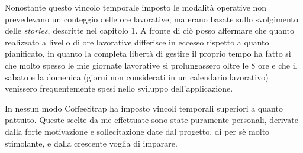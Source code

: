 Nonostante questo vincolo temporale imposto le modalità operative non prevedevano un conteggio delle ore lavorative, ma erano basate sullo svolgimento delle \textit{stories}, descritte nel capitolo 1. A fronte di ciò posso affermare che quanto realizzato a livello di ore lavorative differisce in eccesso rispetto a quanto pianificato, in quanto la completa libertà di gestire il proprio tempo ha fatto sì che molto spesso le mie giornate lavorative si prolungassero oltre le 8 ore e che il sabato e la domenica (giorni non considerati in un calendario lavorativo) venissero frequentemente spesi nello sviluppo dell'applicazione.

In nessun modo CoffeeStrap ha imposto vincoli temporali superiori a quanto pattuito. Queste scelte da me effettuate sono state puramente personali, derivate dalla forte motivazione e sollecitazione date dal progetto, di per sè molto stimolante, e dalla crescente voglia di imparare.

